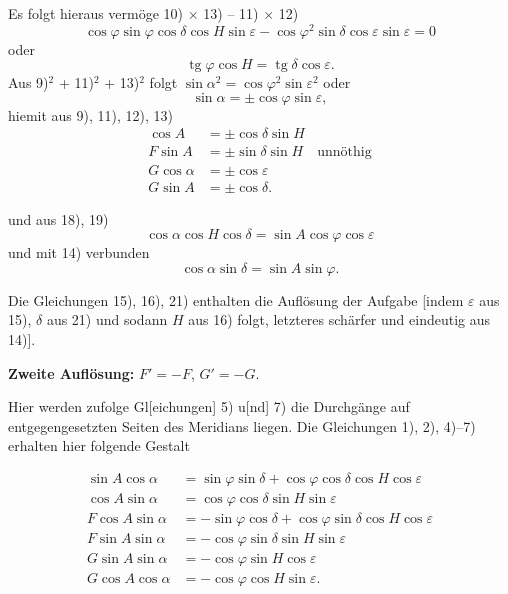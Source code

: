 \documentclass[12pt,a4paper]{article}
\theoremstyle{plain}
\theoremstyle{definition}
\theoremstyle{remark}
\DeclareMathOperator{\tg}{tg}
\begin{document}
Es folgt hieraus verm\"oge 10) $\times$ 13) -- 11) $\times$ 12)
\[
\cos\varphi \sin\varphi \cos\delta \cos H \sin\varepsilon - \cos\varphi^2 \sin\delta \cos\varepsilon \sin\varepsilon = 0
\]
oder
\begin{equation}
\tg\varphi \cos H = \tg\delta \cos\varepsilon.
\end{equation}
Aus 9)$^2$ + 11)$^2$ + 13)$^2$ folgt $\sin\alpha^2 = \cos\varphi^2 \sin\varepsilon^2$ oder
\begin{equation}
\sin\alpha = \pm\cos\varphi \sin\varepsilon,
\end{equation}
hiemit aus 9), 11), 12), 13)
\begin{align}
\cos A &= \pm\cos\delta \sin H \\
F\sin A &= \pm\sin\delta \sin H \quad \text{unn\"othig} \\
G\cos\alpha &= \pm\cos\varepsilon \\
G\sin A &= \pm\cos\delta.
\end{align}

und aus 18), 19)
\begin{equation}
\cos\alpha \cos H \cos\delta = \sin A \cos\varphi \cos\varepsilon
\end{equation}
und mit 14) verbunden
\begin{equation}
\cos\alpha \sin\delta = \sin A \sin\varphi.
\end{equation}

Die Gleichungen 15), 16), 21) enthalten die Aufl\"osung der Aufgabe [indem $\varepsilon$ aus 15), $\delta$ aus 21) und sodann $H$ aus 16) folgt, letzteres sch\"arfer und eindeutig aus 14)].

\newpage

\textbf{Zweite Aufl\"osung:} $F' = -F$, $G' = -G$.

Hier werden zufolge Gl[eichungen] 5) u[nd] 7) die Durchg\"ange auf entgegengesetzten Seiten des Meridians liegen. Die Gleichungen 1), 2), 4)--7) erhalten hier folgende Gestalt

\begin{align}
\sin A\cos\alpha &= \sin\varphi \sin\delta + \cos\varphi \cos\delta \cos H \cos\varepsilon \\
\cos A\sin\alpha &= \cos\varphi \cos\delta \sin H \sin\varepsilon \\
F\cos A\sin\alpha &= -\sin\varphi \cos\delta + \cos\varphi \sin\delta \cos H \cos\varepsilon \\
F\sin A\sin\alpha &= -\cos\varphi \sin\delta \sin H \sin\varepsilon \\
G\sin A\sin\alpha &= -\cos\varphi \sin H \cos\varepsilon \\
G\cos A\cos\alpha &= -\cos\varphi \cos H \sin\varepsilon.
\end{align}
\end{document}
